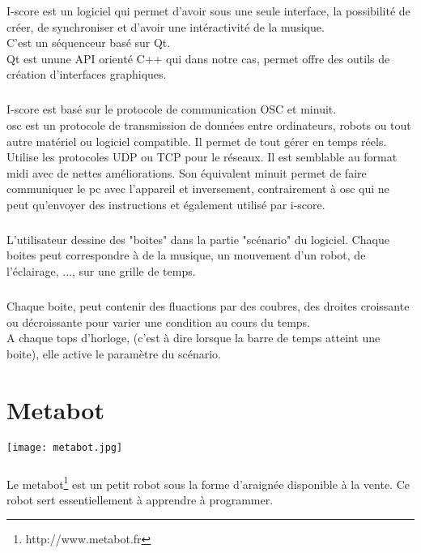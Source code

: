 \documentclass[10pt,a4paper]{report}
\begin{document}
I-score est un logiciel qui permet d'avoir sous une seule interface, la possibilité de créer, de synchroniser et d'avoir une intéractivité de la musique.
\\
C'est un séquenceur basé sur Qt.\\
Qt est unune API orienté C++ qui dans notre cas, permet offre des outils de création d'interfaces graphiques.
\paragraph{}
I-score est basé sur le protocole de communication OSC et minuit.
\\
\acrfull{osc} est un protocole de transmission de données entre ordinateurs, robots ou tout autre matériel ou logiciel compatible. Il permet de tout gérer en temps réels. Utilise les protocoles UDP ou TCP pour le réseaux. Il est semblable au format \acrfull{midi} avec de nettes améliorations. Son équivalent minuit permet de faire communiquer le pc avec l'appareil et inversement, contrairement à \acrshort{osc} qui ne peut qu'envoyer des instructions et également utilisé par i-score.
\paragraph{}
L'utilisateur dessine des "boites" dans la partie "scénario" du logiciel. Chaque boites peut correspondre à de la musique, un mouvement d'un robot, de l'éclairage, ..., sur une grille de temps.
\paragraph{}
Chaque boite, peut contenir des fluactions par des coubres, des droites croissante ou décroissante pour varier une condition au cours du temps.
\\
A chaque tops d'horloge, (c'est à dire lorsque la barre de temps atteint une boite), elle active le paramètre du scénario.

\chapter{Metabot}
\begin{center}
\texttt{[image: metabot.jpg]}
\end{center}

\paragraph{}
Le metabot\footnote{http://www.metabot.fr} est un petit robot sous la forme d'araignée disponible à la vente. Ce robot sert essentiellement à apprendre à programmer.
\end{document}
